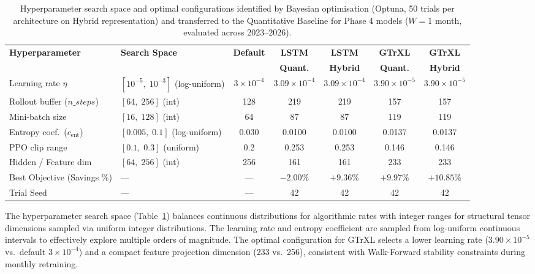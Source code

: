 \begin{table}[htbp]
\centering
\footnotesize
\setlength{\tabcolsep}{2.5pt}
\caption{Hyperparameter search space and optimal configurations identified by Bayesian optimisation (Optuna, 50 trials per architecture on Hybrid representation) and transferred to the Quantitative Baseline for Phase 4 models ($W=1$ month, evaluated across 2023--2026).}
\label{tab:hpo_params}
\begin{tabularx}{\linewidth}{@{} >{\raggedright\arraybackslash}p{2.6cm} >{\raggedright\arraybackslash}X ccccc@{}}
\toprule
\textbf{Hyperparameter} & \textbf{Search Space} & \textbf{Default} & \textbf{LSTM} & \textbf{LSTM} & \textbf{GTrXL} & \textbf{GTrXL} \\
 & & & \textbf{Quant.} & \textbf{Hybrid} & \textbf{Quant.} & \textbf{Hybrid} \\
\midrule
Learning rate $\eta$ & $[10^{-5},\; 10^{-3}]$ (log-uniform) & $3 \times 10^{-4}$ & $3.09 \times 10^{-4}$ & $3.09 \times 10^{-4}$ & $3.90 \times 10^{-5}$ & $3.90 \times 10^{-5}$ \\
Rollout buffer ($n\_steps$) & $[64,\; 256]$ (int) & 128 & 219 & 219 & 157 & 157 \\
Mini-batch size & $[16,\; 128]$ (int) & 64 & 87 & 87 & 119 & 119 \\
Entropy coef.\ ($c_{\text{ent}}$) & $[0.005,\; 0.1]$ (log-uniform) & 0.030 & 0.0100 & 0.0100 & 0.0137 & 0.0137 \\
PPO clip range & $[0.1,\; 0.3]$ (uniform) & 0.2 & 0.253 & 0.253 & 0.146 & 0.146 \\
Hidden / Feature dim & $[64,\; 256]$ (int) & 256 & 161 & 161 & 233 & 233 \\
\midrule
Best Objective (Savings \%) & --- & --- & $-2.00\%$ & $+9.36\%$ & $+9.97\%$ & $+10.85\%$ \\
Trial Seed & --- & --- & 42 & 42 & 42 & 42 \\
\bottomrule
\end{tabularx}
\end{table}

The hyperparameter search space (Table~\ref{tab:hpo_params}) balances continuous distributions for algorithmic rates with integer ranges for structural tensor dimensions sampled via uniform integer distributions. The learning rate and entropy coefficient are sampled from log-uniform continuous intervals to effectively explore multiple orders of magnitude. The optimal configuration for GTrXL selects a lower learning rate ($3.90 \times 10^{-5}$ vs.\ default $3 \times 10^{-4}$) and a compact feature projection dimension (233 vs.\ 256), consistent with Walk-Forward stability constraints during monthly retraining.

